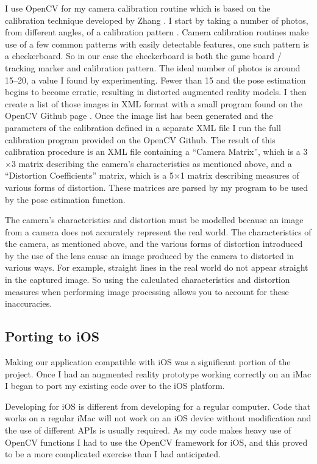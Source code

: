 \documentclass{article}
\begin{document}
I use OpenCV for my camera calibration routine which is based on the calibration technique developed by Zhang \cite{zhang}. I start by taking a number of photos, from different angles, of a calibration pattern \cite{calib2}. Camera calibration routines make use of a few common patterns with easily detectable features, one such pattern is a checkerboard. So in our case the checkerboard is both the game board / tracking marker and calibration pattern. The ideal number of photos is around 15--20, a value I found by experimenting. Fewer than 15 and the pose estimation begins to become erratic, resulting in distorted augmented reality models. I then create a list of those images in XML format with a small program found on the OpenCV Github page \cite{opencvGit}. Once the image list has been generated and the parameters of the calibration defined in a separate XML file I run the full calibration program provided on the OpenCV Github. The result of this calibration procedure is an XML file containing a “Camera Matrix”, which is a 3$\times$3 matrix describing the camera's characteristics as mentioned above, and a “Distortion Coefficients” matrix, which is a 5$\times$1 matrix describing measures of various forms of distortion. These matrices are parsed by my program to be used by the pose estimation function. 

The camera's characteristics and distortion must be modelled  because an image from a camera does not accurately represent the real world. The characteristics of the camera, as mentioned above, and the various forms of distortion introduced by the use of the lens cause an image produced by the camera to distorted in various ways. For example, straight lines in the real world do not appear straight in the captured image. So using the calculated characteristics and distortion measures when performing image processing allows you to account for these inaccuracies.


\subsection{Porting to iOS}

Making our application compatible with iOS was a significant portion of the project. Once I had an augmented reality prototype working correctly on an iMac I began to port my existing code over to the iOS platform. \par

Developing for iOS is different from developing for a regular computer. Code that works on a regular iMac will not work on an iOS device without modification and the use of different APIs is usually required. As my code makes heavy use of OpenCV functions I had to use the OpenCV framework for iOS, and this proved to be a more complicated exercise than I had anticipated. \par
\end{document}
